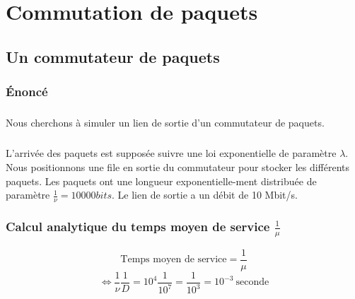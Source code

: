 %
\chapter{Commutation de paquets}
%
    \section{Un commutateur de paquets}
%
        \subsection{Énoncé}
%
            \paragraph{}
Nous cherchons à simuler un lien de sortie d'un commutateur de paquets.
%
            \paragraph{}
L'arrivée des paquets est supposée suivre une loi exponentielle de paramètre $\lambda$.
Nous positionnons une file en sortie du commutateur pour stocker les différents paquets.
Les paquets ont une longueur exponentielle-ment distribuée de paramètre $\frac{1}{\nu} = 10 000 bits$.
Le lien de sortie a un débit de 10 Mbit/s.
%
        \subsection{Calcul analytique du temps moyen de service $\frac{1}{\mu}$}
\[  \text{Temps moyen de service} = \frac{1}{\mu} \]
\[ \iff \frac{1}{\nu} \frac{1}{D} = 10^{4} \frac{1}{10^{7}} = \frac{1}{10^{3}} = 10^{-3} \ \text{seconde} \]
%
